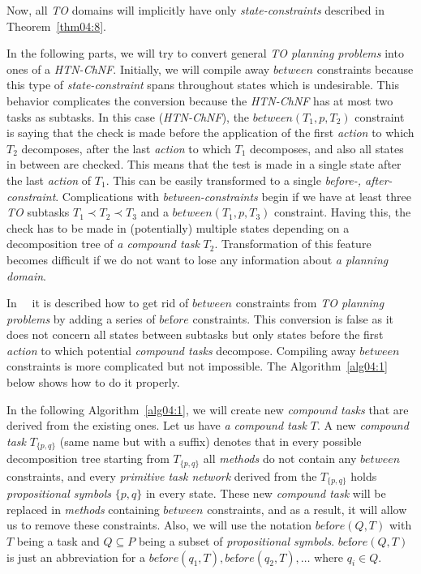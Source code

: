 \medskip\noindent
Now, all \emph{TO} domains will implicitly have only \emph{state-constraints} described in Theorem~\ref{thm04:8}.

\medskip\noindent\label{rem-between-two-tasks}
In the following parts, we will try to convert general \emph{TO planning problems} into ones of a \emph{HTN-ChNF}. Initially, we will compile away $between$ constraints because this type of \emph{state-constraint} spans throughout states which is undesirable. This behavior complicates the conversion because the \emph{HTN-ChNF} has at most two tasks as subtasks. In this case (\emph{HTN-ChNF}), the $between(T_1, p, T_2)$ constraint is saying that the check is made before the application of the first \emph{action} to which $T_2$ decomposes, after the last \emph{action} to which $T_1$ decomposes, and also all states in between are checked. This means that the test is made in a single state after the last \emph{action} of $T_1$. This can be easily transformed to a single \emph{before-, after-constraint}. Complications with \emph{between-constraints} begin if we have at least three \emph{TO} subtasks $T_1 \prec T_2 \prec T_3$ and a $between(T_1, p, T_3)$ constraint. Having this, the check has to be made in (potentially) multiple states depending on a decomposition tree of \emph{a compound task} $T_2$. Transformation of this feature becomes difficult if we do not want to lose any information about \emph{a planning domain}.

\medskip\noindent
In~\cite{ondrckova2023semantics}~\cite{ondrckova2024empty} it is described how to get rid of $between$ constraints from \emph{TO planning problems} by adding a series of $be\text{f}ore$ constraints. This conversion is false as it does not concern all states between subtasks but only states before the first \emph{action} to which potential \emph{compound tasks} decompose. Compiling away $between$ constraints is more complicated but not impossible. The Algorithm~\ref{alg04:1} below shows how to do it properly.

\medskip\noindent
In the following Algorithm~\ref{alg04:1}, we will create new \emph{compound tasks} that are derived from the existing ones. Let us have \emph{a compound task} $T$. A new \emph{compound task} $T_{\{p, q\}}$ (same name but with a suffix) denotes that in every possible decomposition tree starting from $T_{\{p, q\}}$ all \emph{methods} do not contain any $between$ constraints, and every \emph{primitive task network} derived from the $T_{\{p, q\}}$ holds \emph{propositional symbols} $\{p, q\}$ in every state. These new \emph{compound task} will be replaced in \emph{methods} containing $between$ constraints, and as a result, it will allow us to remove these constraints. Also, we will use the notation $be\text{f}ore(Q, T)$ with $T$ being a task and $Q \subseteq P$ being a subset of \emph{propositional symbols}. $be\text{f}ore(Q, T)$ is just an abbreviation for a $be\text{f}ore(q_1, T), be\text{f}ore(q_2, T), \dots$ where $q_i \in Q$.

